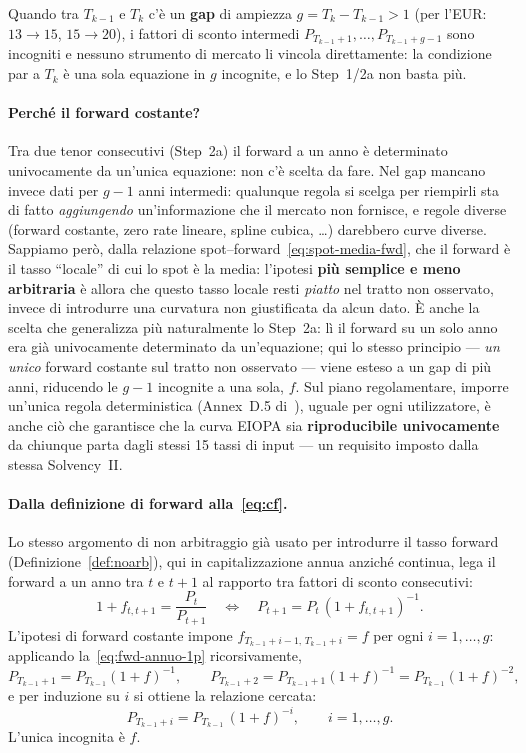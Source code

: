 \documentclass[11pt,a4paper]{article}
\theoremstyle{plain}
\theoremstyle{definition}
\theoremstyle{remark}
\begin{document}
Quando tra $T_{k-1}$ e $T_k$ c'\`e un \textbf{gap} di ampiezza $g=T_k-T_{k-1}>1$ (per l'EUR:
$13\!\to\!15$, $15\!\to\!20$), i fattori di sconto intermedi
$P_{T_{k-1}+1},\ldots,P_{T_{k-1}+g-1}$ sono incogniti e nessuno strumento di mercato li
vincola direttamente: la condizione par a $T_k$ \`e una sola equazione in $g$ incognite, e lo
Step~1/2a non basta pi\`u.

\paragraph{Perch\'e il forward costante?}
Tra due tenor consecutivi (Step~2a) il forward a un anno \`e determinato univocamente da
un'unica equazione: non c'\`e scelta da fare. Nel gap mancano invece dati per $g-1$ anni
intermedi: qualunque regola si scelga per riempirli sta di fatto \emph{aggiungendo}
un'informazione che il mercato non fornisce, e regole diverse (forward costante, zero rate
lineare, spline cubica, \ldots) darebbero curve diverse. Sappiamo per\`o, dalla relazione
spot--forward~\eqref{eq:spot-media-fwd}, che il forward \`e il tasso ``locale'' di cui lo
spot \`e la media: l'ipotesi \textbf{pi\`u semplice e meno arbitraria} \`e allora che questo
tasso locale resti \emph{piatto} nel tratto non osservato, invece di introdurre una curvatura
non giustificata da alcun dato. \`E anche la scelta che generalizza pi\`u naturalmente lo
Step~2a: l\`i il forward su un solo anno era gi\`a univocamente determinato da un'equazione;
qui lo stesso principio --- \emph{un unico} forward costante sul tratto non osservato ---
viene esteso a un gap di pi\`u anni, riducendo le $g-1$ incognite a una sola, $f$. Sul piano
regolamentare, imporre un'unica regola deterministica (Annex~D.5 di~\cite{eiopa2026}), uguale
per ogni utilizzatore, \`e anche ci\`o che garantisce che la curva EIOPA sia
\textbf{riproducibile univocamente} da chiunque parta dagli stessi 15 tassi di input --- un
requisito imposto dalla stessa Solvency~II.

\paragraph{Dalla definizione di forward alla~\eqref{eq:cf}.}
Lo stesso argomento di non arbitraggio gi\`a usato per introdurre il tasso forward
(Definizione~\ref{def:noarb}), qui in capitalizzazione annua anzich\'e continua, lega il
forward a un anno tra $t$ e $t+1$ al rapporto tra fattori di sconto consecutivi:
\begin{equation}
  \label{eq:fwd-annuo-1p}
  1 + f_{t,t+1} = \frac{P_t}{P_{t+1}}
  \quad\Longleftrightarrow\quad
  P_{t+1} = P_t\,(1+f_{t,t+1})^{-1}.
\end{equation}
L'ipotesi di forward costante impone $f_{T_{k-1}+i-1,\,T_{k-1}+i} = f$ per ogni
$i=1,\ldots,g$: applicando la~\eqref{eq:fwd-annuo-1p} ricorsivamente,
\[
  P_{T_{k-1}+1} = P_{T_{k-1}}(1+f)^{-1},
  \qquad
  P_{T_{k-1}+2} = P_{T_{k-1}+1}(1+f)^{-1} = P_{T_{k-1}}(1+f)^{-2},
\]
e per induzione su $i$ si ottiene la relazione cercata:
\begin{equation}
  \label{eq:cf}
  P_{T_{k-1}+i} = P_{T_{k-1}}\,(1+f)^{-i}, \qquad i=1,\ldots,g.
\end{equation}
L'unica incognita \`e $f$.
\end{document}
